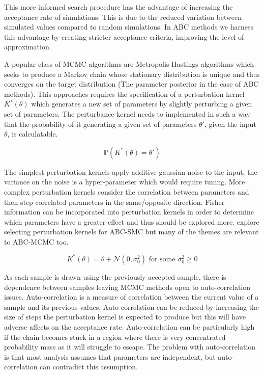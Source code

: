 \documentclass[11pt,a4paper]{article}
\newcommand*{\prob}{\mathbb{P}}
\theoremstyle{break}
\begin{document}
  \par This more informed search procedure has the advantage of increasing the acceptance rate of simulations. This is due to the reduced variation between simulated values compared to random simulations. In ABC methods we harness this advantage by creating stricter acceptance criteria, improving the level of approximation.

  \par A popular class of MCMC algorithms are Metropolis-Hastings algorithms \cite[]{equation_of_state_calculations_by_fast_computing_machines,monte_carlo_methods_using_markov_chains_and_their_applications} which seeks to produce a Markov chain whose stationary distribution is unique and thus converges on the target distribution (The parameter posterior in the case of ABC methods). This approaches requires the specification of a perturbation kernel $K^*(\theta)$ which generates a new set of parameters by slightly perturbing a given set of parameters. The perturbance kernel needs to implemented in such a way that the probability of it generating a given set of parameters $\theta'$, given the input $\theta$, is calculatable.

  \[ \prob\left(K^*(\theta)=\theta'\right) \]

  \par The simplest perturbation kernels apply additive gaussian noise to the input, the variance on the noise is a hyper-parameter which would require tuning. More complex perturbation kernels consider the correlation between parameters and then step correlated parameters in the same/opposite direction. Fisher information can be incorporated into perturbation kernels in order to determine which parameters have a greater effect and thus should be explored more. \cite[]{on_optimality_of_kernels_for_approximate_bayesian_computation_using_SMC} explore selecting perturbation kernels for ABC-SMC but many of the themes are relevant to ABC-MCMC too.

  \[ K^*(\theta)=\theta+\mathcal{N}(0,\sigma_0^2)\text{ for some }\sigma_0^2\geq0 \]

  \par As each sample is drawn using the previously accepted sample, there is dependence between samples leaving MCMC methods open to auto-correlation issues. Auto-correlation is a measure of correlation between the current value of a sample and its previous values. Auto-correlation can be reduced by increasing the size of steps the perturbation kernel is expected to produce but this will have adverse affects on the acceptance rate. Auto-correlation can be particularly high if the chain becomes stuck in a region where there is very concentrated probability mass as it will struggle to escape. The problem with auto-correlation is that most analysis assumes that parameters are independent, but auto-correlation can contradict this assumption.
\end{document}
